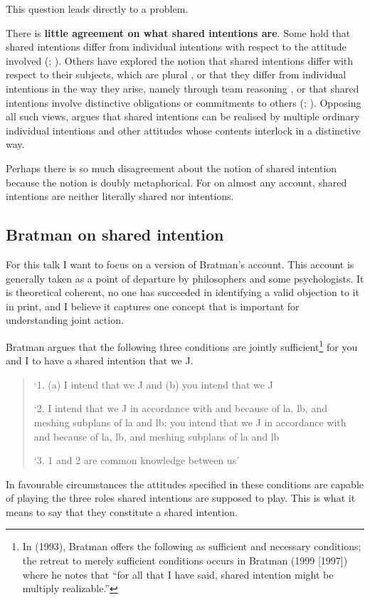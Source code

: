 \documentclass[14pt,a4paper]{extarticle}
\begin{document}
This question leads directly to a problem.

There is \textbf{little agreement on what shared intentions are}. 
Some hold that shared intentions differ from individual intentions with respect to the attitude involved (\citealp{Kutz:2000si}; \citealp{Searle:1990em}). 
Others have explored the notion that shared intentions differ with respect to their subjects, which are plural \citep{Gilbert:1992rs}, 
or that they differ from individual intentions in the way they arise, namely through team reasoning \citep{Gold:2007zd}, 
or that shared intentions involve distinctive obligations or commitments to others (\citealp{Gilbert:1992rs}; \citealp{Roth:2004ki}).
Opposing all such views, \citet{Bratman:1992mi,Bratman:2009lv} argues that shared intentions can be realised by multiple ordinary individual intentions and other attitudes whose contents interlock in a distinctive way. 

Perhaps there is so much disagreement about the notion of shared intention because the notion is doubly metaphorical.  
For on almost any account, shared intentions are neither literally shared nor intentions.


\subsection{Bratman on shared intention}
For this talk I want to focus on a version of Bratman's account.
This account is generally taken as a point of departure by philosophers and some psychologists.
It is theoretical coherent, 
no one has succeeded in identifying a valid objection to it in print, 
and I believe it captures one concept that is important for understanding joint action.

Bratman argues that the following three conditions are jointly sufficient\footnote{
In (1993), Bratman offers the following as sufficient and necessary conditions; the retreat to merely sufficient conditions occurs in Bratman (1999 [1997]) where he notes that “for all that I have said, shared intention might be multiply realizable.”
}  
for you and I to have a shared intention that we J. 
%
\begin{quote}
`1. (a) I intend that we J and (b) you intend that we J

`2. I intend that we J in accordance with and because of la, lb, and meshing subplans of la and lb; you intend that we J in accordance with and because of la, lb, and meshing subplans of la and lb

`3. 1 and 2 are common knowledge between us' \citep[View 4]{Bratman:1993je}
\end{quote}
%
In favourable circumstances the attitudes specified in these conditions are capable of playing the three roles shared intentions are supposed to play.  This is what it means to say that they constitute a shared intention.
\end{document}
